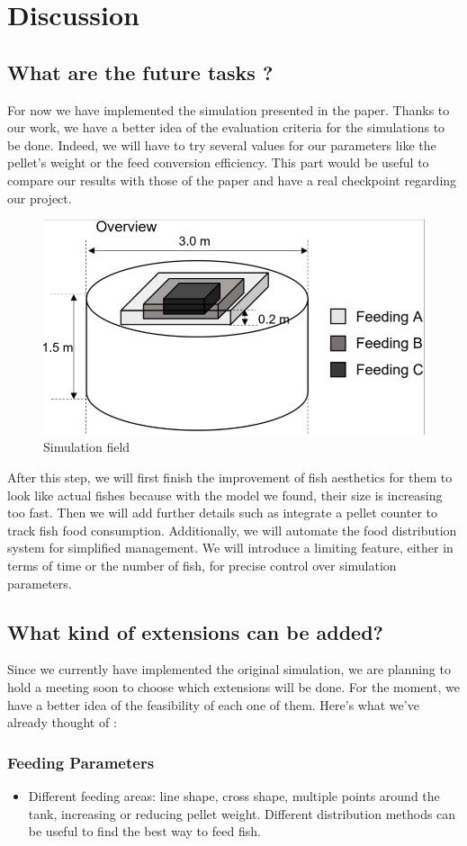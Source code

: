 \documentclass[9pt]{pnas-new}
\begin{document}
\section{Discussion}
\subsection{What are the future tasks ?}
For now we have implemented the simulation presented in the paper. Thanks to our work, we have a better idea of the evaluation criteria for the simulations to be done. Indeed, we will have to try several values for our parameters like the pellet's weight or the feed conversion efficiency. This part would be useful to compare our results with those of the paper and have a real checkpoint regarding our project.


\begin{figure}
    \centering
    \includegraphics[width=0.3\linewidth]{fig5.png}
    \caption{Simulation field}
    \label{fig:enter-label}
\end{figure}

After this step, we will first finish the improvement of fish aesthetics for them to look like actual fishes because with the model we found, their size is increasing too fast. Then we will add further details such as integrate a pellet counter to track fish food consumption. Additionally, we will automate the food distribution system for simplified management. We will introduce a limiting feature, either in terms of time or the number of fish, for precise control over simulation parameters.

\subsection{What kind of extensions can be added?}
Since we currently have implemented the original simulation, we are planning to hold a meeting soon to choose which extensions will be done. For the moment, we have a better idea of the feasibility of each one of them. Here's what we've already thought of :

\small\subsubsection*{Feeding Parameters}
\begin{itemize}
    \item Different feeding areas: line shape, cross shape, multiple points around the tank, increasing or reducing pellet weight. Different distribution methods can be useful to find the best way to feed fish.
\end{itemize}
\end{document}
